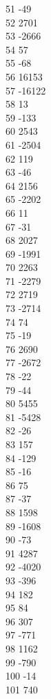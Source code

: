 { 51	-49 \\
 52	2701 \\
 53	-2666 \\
 54	57 \\
 55	-68 \\
 56	16153 \\
 57	-16122 \\
 58	13 \\
 59	-133 \\
 60	2543 \\
 61	-2504 \\
 62	119 \\
 63	-46 \\
 64	2156 \\
 65	-2202 \\
 66	11 \\
 67	-31 \\
 68	2027 \\
 69	-1991 \\
 70	2263 \\
 71	-2279 \\
 72	2719 \\
 73	-2714 \\
 74	74 \\
 75	-19 \\
 76	2690 \\
 77	-2672 \\
 78	-22 \\
 79	-44 \\
 80	5455 \\
 81	-5428 \\
 82	-26 \\
 83	157 \\
 84	-129 \\
 85	-16 \\
 86	75 \\
 87	-37 \\
 88	1598 \\
 89	-1608 \\
 90	-73 \\
 91	4287 \\
 92	-4020 \\
 93	-396 \\
 94	182 \\
 95	84 \\
 96	307 \\
 97	-771 \\
 98	1162 \\
 99	-790 \\
 100	-14 \\
 101	740 \\
}
